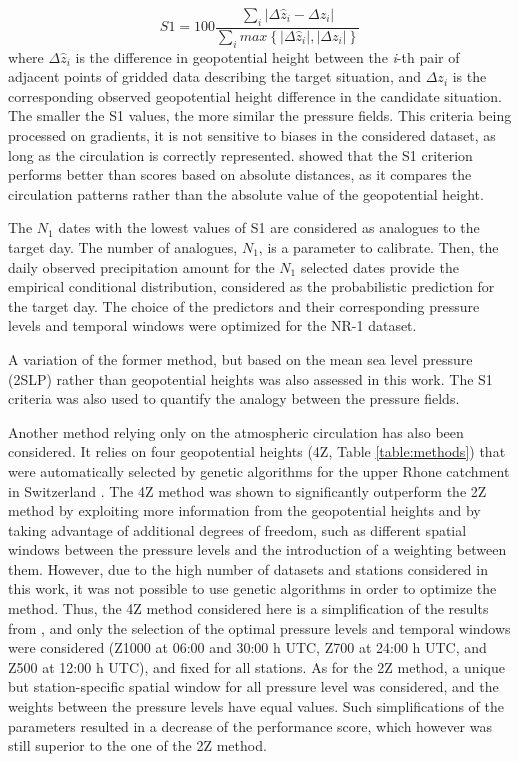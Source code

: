 \documentclass{ametsoc}
\begin{document}
\begin{equation}
\label{eq:S1}
S1=100 \frac {\displaystyle \sum_{i} \vert \Delta\hat{z}_{i} - \Delta z_{i} \vert}
{\displaystyle \sum_{i} max\left\lbrace \vert \Delta\hat{z}_{i} \vert , \vert \Delta z_{i} \vert \right\rbrace }
\end{equation}
where $\Delta \hat{z}_{i}$ is the difference in geopotential height between the \textit{i}-th pair of adjacent points of gridded data describing the target situation, and $\Delta z_{i}$ is the corresponding observed geopotential height difference in the candidate situation. The smaller the S1 values, the more similar the pressure fields. This criteria being processed on gradients, it is not sensitive to biases in the considered dataset, as long as the circulation is correctly represented. \citet{Bontron2004} showed that the S1 criterion performs better than scores based on absolute distances, as it compares the circulation patterns rather than the absolute value of the geopotential height. 

The $N_{1}$ dates with the lowest values of S1 are considered as analogues to the target day. The number of analogues, $N_{1}$, is a parameter to calibrate. Then, the daily observed precipitation amount for the $N_{1}$ selected dates provide the empirical conditional distribution, considered as the probabilistic prediction for the target day. The choice of the predictors and their corresponding pressure levels and temporal windows were optimized for the NR-1 dataset.

A variation of the former method, but based on the mean sea level pressure (2SLP) rather than geopotential heights was also assessed in this work. The S1 criteria was also used to quantify the analogy between the pressure fields.

Another method relying only on the atmospheric circulation has also been considered. It relies on four geopotential heights (4Z, Table \ref{table:methods}) that were automatically selected by genetic algorithms for the upper Rhone catchment in Switzerland \citep{Horton2017b}. The 4Z method was shown to significantly outperform the 2Z method by exploiting more information from the geopotential heights and by taking advantage of additional degrees of freedom, such as different spatial windows between the pressure levels and the introduction of a weighting between them. However, due to the high number of datasets and stations considered in this work, it was not possible to use genetic algorithms in order to optimize the method. Thus, the 4Z method considered here is a simplification of the results from \citet{Horton2017b}, and only the selection of the optimal pressure levels and temporal windows were considered (Z1000 at 06:00 and 30:00 h UTC, Z700 at 24:00 h UTC, and Z500 at 12:00 h UTC), and fixed for all stations. As for the 2Z method, a unique but station-specific spatial window for all pressure level was considered, and the weights between the pressure levels have equal values. Such simplifications of the parameters resulted in a decrease of the performance score, which however was still superior to the one of the 2Z method.
\end{document}
